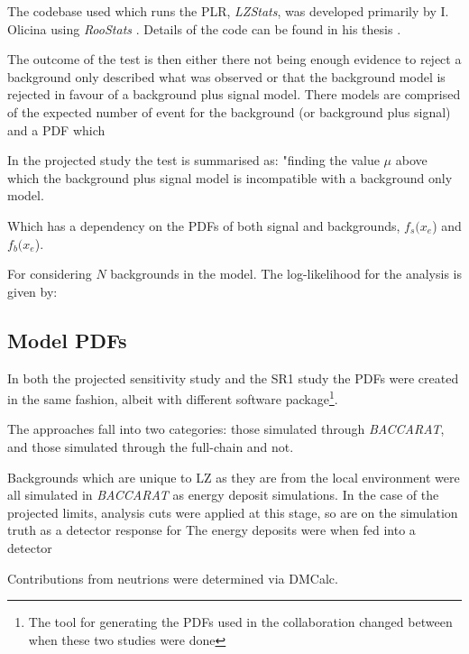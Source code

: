 \par
The codebase used which runs the PLR, \textit{LZStats}, was developed primarily by I. Olicina using \textit{RooStats} \cite{roostats_ref}.
Details of the code can be found in his thesis \cite{LZ_Ibles_LZStats_Thesis_ref}.


\iffalse
The outcome of the test is then either there not being enough evidence to reject a background only described what was observed or that the background model is rejected in favour of a background plus signal model.
There models are comprised of the expected number of event for the background (or background plus signal) and a PDF which 


\par
In the projected study the test is summarised as:
"finding the value $\mu$ above which the background plus signal model is incompatible with a background only model.

Which has a dependency on the PDFs of both signal and backgrounds, $f_s($\textbf{$x_e$}) and $f_b($\textbf{$x_e$}).

For considering $N$ backgrounds in the model.
The log-likelihood for the analysis is given by:



\subsection{Model PDFs}
\par
In both the projected sensitivity study and the SR1 study the PDFs were created in the same fashion, albeit with different software package\footnote{The tool for generating the PDFs used in the collaboration changed between when these two studies were done}.



The approaches fall into two categories: those simulated through \textit{BACCARAT}, and those  simulated through the full-chain and not.

\par
Backgrounds which are unique to LZ as they are from the local environment were all simulated in \textit{BACCARAT} as energy deposit simulations.
In the case of the projected limits, analysis cuts were applied at this stage, so are on the simulation truth as a detector response for 
The energy deposits were when fed into a detector


\par

Contributions from neutrions were determined via DMCalc. 



